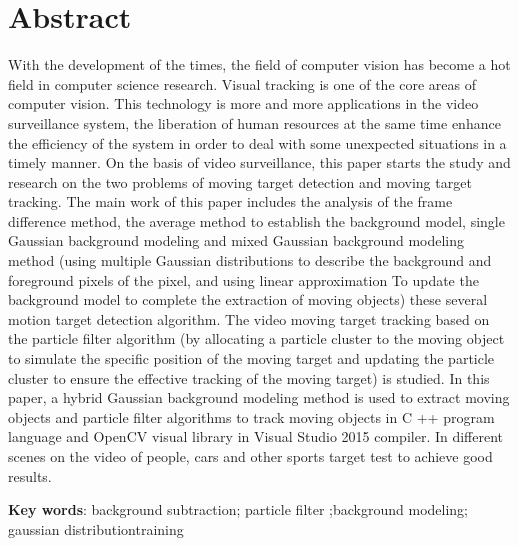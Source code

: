 \documentclass[UTF8, twoside]{ctexart}
\begin{document}
\section*{\arialfont\bfseries Abstract}
\titlespacing*{\section}{0pt}{0pt}{34pt}
\vspace*{0.2cm}
With the development of the times, the field of computer vision has become a hot field in computer science research. Visual tracking is one of the core areas of computer vision. This technology is more and more applications in the video surveillance system, the liberation of human resources at the same time enhance the efficiency of the system in order to deal with some unexpected situations in a timely manner.
On the basis of video surveillance, this paper starts the study and research on the two problems of moving target detection and moving target tracking. The main work of this paper includes the analysis of the frame difference method, the average method to establish the background model, single Gaussian background modeling and mixed Gaussian background modeling method (using multiple Gaussian distributions to describe the background and foreground pixels of the pixel, and using linear approximation To update the background model to complete the extraction of moving objects) these several motion target detection algorithm. The video moving target tracking based on the particle filter algorithm (by allocating a particle cluster to the moving object to simulate the specific position of the moving target and updating the particle cluster to ensure the effective tracking of the moving target) is studied.
In this paper, a hybrid Gaussian background modeling method is used to extract moving objects and particle filter algorithms to track moving objects in C ++ program language and OpenCV visual library in Visual Studio 2015 compiler. In different scenes on the video of people, cars and other sports target test to achieve good results.

\vspace{1.4em}
\noindent\textbf{Key words}: background subtraction; particle filter ;background modeling; gaussian distributiontraining
\newpage\cleardoublepage

\tableofcontents
\newpage\cleardoublepage

\vspace*{3pt}
\end{document}
